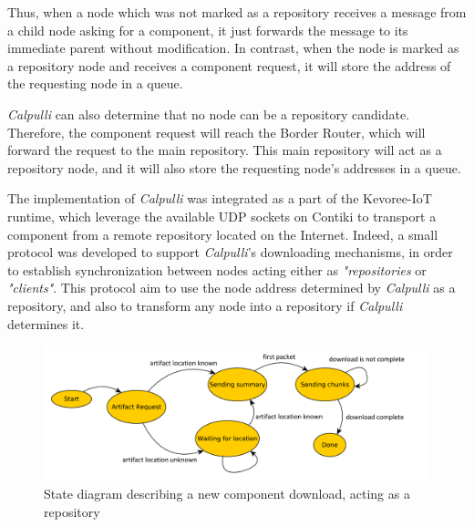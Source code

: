 Thus, when a node which was not marked as a repository receives a message from a child node asking for a component, it just forwards the message to its immediate parent without modification.
In contrast, when the node is marked as a repository node and receives a component request, it will store the address of the requesting node in a queue.

\textit{Calpulli} can also determine that no node can be a repository candidate.
Therefore, the component request will reach the Border Router, which will forward the request to the main repository.
This main repository will act as a repository node, and it will also store the requesting node's addresses in a queue.

The implementation of \textit{Calpulli} was integrated as a part of the Kevoree-IoT runtime, which leverage the available UDP sockets on Contiki to transport a component from a remote repository located on the Internet.
Indeed, a small protocol was developed to support \textit{Calpulli}'s downloading mechanisms, in order to establish synchronization between nodes acting either as \textit{"repositories} or \textit{"clients"}.
This protocol aim to use the node address determined by \textit{Calpulli} as a repository, and also to transform any node into a repository if \textit{Calpulli} determines it.

\begin{figure}[]
	\centering
	\includegraphics[width=0.98\columnwidth]{chapters/calpulli.images/calpulliProtocol.pdf}
	\caption{State diagram describing a new component download, acting as a repository} \label{fig:calpulliProtocol}
\end{figure}

